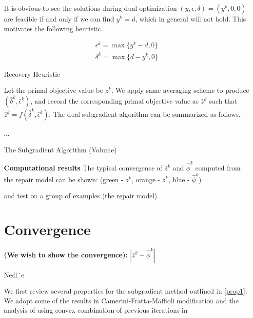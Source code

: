 \documentclass[
  a4paper,
,tablecaptionabove
]{scrartcl}
\numberwithin{equation}{section}
\begin{document}
It is obvious to see the solutions during dual optimization
\((y, \epsilon, \delta) = (y^k, 0, 0)\) are feasible if and only if we
can find \(y^k = d\), which in general will not hold. This motivates the
following heuristic.

\begin{algorithm}[H]
  \SetAlgoLined
  \[\begin{aligned}
      \epsilon^k = \max\{y^k - d, 0\} \\
      \delta^k = \max\{d - y^k, 0\}
    \end{aligned}\]
  \caption{Recovery Heuristic}
\end{algorithm}

Let the primal objective value be \(z^k\). We apply same averaging scheme to produce \((\bar \delta^k, \bar \epsilon^k)\), and record the
corresponding primal objective value as \(\bar z^k\) such that \(\bar z^k = f(\bar \delta^k, \bar \epsilon^k)\).
The dual subgradient algorithm can be summarized as follows.

\begin{algorithm}[H]
  \SetAlgoLined
  ...
  \caption{The Subgradient Algorithm (Volume)}
\end{algorithm}

\textbf{Computational results}
The typical convergence of \(\bar z^k\) and \(\hat \phi^k\) computed
from the repair model can be shown: (green - \(z^k\), orange -
\(\bar z^k\), blue - \(\hat \phi^k\))


and test on a group of examples (the repair model)


\hypertarget{subgradient-method}{%
  \section{Convergence}\label{Convergence}}

\textbf{(We wish to show the convergence):} \(|\bar z^k -\hat \phi^k|\)



Nedi´c

We first review several properties for the subgradient method outlined in \ref{prop1}.
We adopt some of the results in Camerini-Fratta-Maffioli modification \cite{camerini1975improving}
and the analysis of using convex combination of previous iterations in \cite{brannlund1995generalized}
\end{document}
